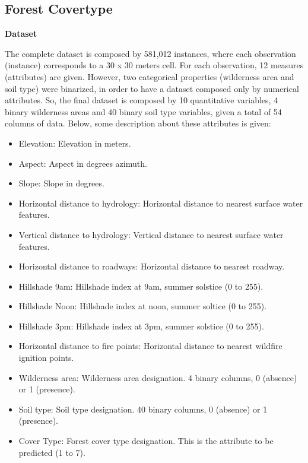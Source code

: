 \documentclass[conference]{IEEEtran}
\begin{document}

\subsection{Forest Covertype}
\noindent \textbf{Dataset}

\noindent The complete dataset is composed by 581,012 instances, where each observation (instance) corresponds to a 30 x 30 meters cell. For each observation, 12 measures (attributes) are given. However, two categorical properties (wilderness area and soil type) were binarized, in order to have a dataset composed only by numerical attributes. So, the final dataset is composed by 10 quantitative variables, 4 binary wilderness areas and 40 binary soil type variables, given a total of 54 columns of data. Below, some description about these attributes is given:
\begin{itemize}
\item{Elevation: Elevation in meters.}
\item{Aspect: Aspect in degrees azimuth. }
\item{Slope: Slope in degrees.}
\item{Horizontal distance to hydrology: Horizontal distance to nearest surface water features. }
\item{Vertical distance to hydrology: Vertical distance to nearest surface water features. }
\item{Horizontal distance to roadways: Horizontal distance to nearest roadway. }
\item{Hillshade 9am: Hillshade index at 9am, summer solstice (0 to 255). }
\item{Hillshade Noon: Hillshade index at noon, summer soltice (0 to 255). }
\item{Hillshade 3pm: Hillshade index at 3pm, summer solstice (0 to 255). }
\item{Horizontal distance to fire points: Horizontal distance to nearest wildfire ignition points. }
\item{Wilderness area: Wilderness area designation. 4 binary columns, 0 (absence) or 1 (presence). }
\item{Soil type: Soil type designation. 40 binary columns, 0 (absence) or 1 (presence). }
\item{Cover Type: Forest cover type designation. This is the attribute to be predicted (1 to 7).}
\end{itemize}
\end{document}
